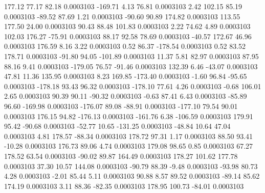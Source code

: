       177.12       77.17       82.18     0.0003103
     -169.71        4.13       76.81     0.0003103
        2.42      102.15       85.19     0.0003103
      -89.52       87.69        1.21     0.0003103
      -90.60       90.89      174.82     0.0003103
      113.55      177.50       24.00     0.0003103
       90.43       88.48      101.83     0.0003103
        2.22       74.62        4.89     0.0003103
      102.03      176.27      -75.91     0.0003103
       88.17       92.58       78.69     0.0003103
      -40.57      172.67       46.96     0.0003103
      176.59        8.16        3.22     0.0003103
        0.52       86.37     -178.54     0.0003103
        0.52       83.52      178.71     0.0003103
      -91.80       94.05     -101.89     0.0003103
       11.37        5.81       82.97     0.0003103
       87.95       88.16        9.41     0.0003103
     -179.05       76.57      -91.46     0.0003103
      132.39        6.46      -43.07     0.0003103
       47.81       11.36      135.95     0.0003103
        8.23      169.85     -173.40     0.0003103
       -1.60       96.84      -95.65     0.0003103
     -178.18       93.43       96.32     0.0003103
     -178.10       77.61        4.26     0.0003103
       -0.68      106.01        2.65     0.0003103
       90.39       90.11      -90.32     0.0003103
       -0.63       87.41        6.43     0.0003103
      -85.89       96.60     -169.98     0.0003103
     -176.07       89.08      -88.91     0.0003103
     -177.10       79.54       90.01     0.0003103
      176.15       94.82     -176.13     0.0003103
     -161.76        6.38     -106.59     0.0003103
      179.91       95.42      -90.68     0.0003103
      -52.77       10.65     -131.25     0.0003103
      -48.84       10.64       47.04     0.0003103
        4.81      178.57      -88.34     0.0003103
      178.72       97.31        1.17     0.0003103
       88.50       93.41      -10.28     0.0003103
      176.73       89.06        4.74     0.0003103
      179.08       98.65        0.85     0.0003103
       67.27      178.52       63.54     0.0003103
      -90.02       89.87      164.49     0.0003103
      178.27      101.62      177.78     0.0003103
       37.30       10.57      144.08     0.0003103
      -90.79       88.39       -9.48     0.0003103
      -93.98       80.73        4.28     0.0003103
       -2.01       85.44        5.11     0.0003103
       90.88        8.57       89.52     0.0003103
      -89.14       85.62      174.19     0.0003103
        3.11       88.36      -82.35     0.0003103
      178.95      100.73      -84.01     0.0003103
